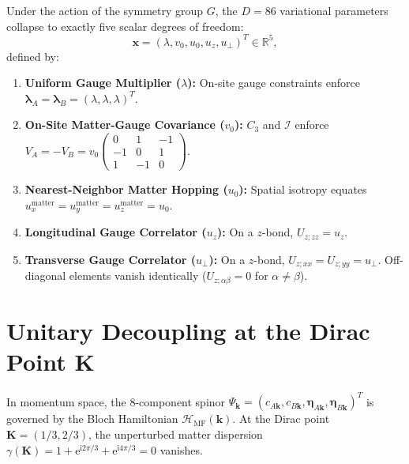 \begin{theorem}[Manifold Collapse to $D_{\mathrm{sym}} = 5$]
Under the action of the symmetry group $G$, the $D = 86$ variational parameters collapse to exactly five scalar degrees of freedom:
\begin{equation}
\label{eq:phase4_sym_vector}
\bm{x} = (\lambda, v_0, u_0, u_z, u_\perp)^T \in \mathbb{R}^5,
\end{equation}
defined by:
\begin{enumerate}
    \item \textbf{Uniform Gauge Multiplier ($\lambda$):} On-site gauge constraints enforce $\bm{\lambda}_A = \bm{\lambda}_B = (\lambda, \lambda, \lambda)^T$.
    \item \textbf{On-Site Matter-Gauge Covariance ($v_0$):} $C_3$ and $\mathcal{I}$ enforce $V_A = -V_B = v_0 \begin{pmatrix} 0 & 1 & -1 \\ -1 & 0 & 1 \\ 1 & -1 & 0 \end{pmatrix}$.
    \item \textbf{Nearest-Neighbor Matter Hopping ($u_0$):} Spatial isotropy equates $u_x^{\mathrm{matter}} = u_y^{\mathrm{matter}} = u_z^{\mathrm{matter}} = u_0$.
    \item \textbf{Longitudinal Gauge Correlator ($u_z$):} On a $z$-bond, $U_{z; zz} = u_z$.
    \item \textbf{Transverse Gauge Correlator ($u_\perp$):} On a $z$-bond, $U_{z; xx} = U_{z; yy} = u_\perp$. Off-diagonal elements vanish identically ($U_{z; \alpha\beta} = 0$ for $\alpha \neq \beta$).
\end{enumerate}
\end{theorem}

\section{Unitary Decoupling at the Dirac Point $\mathbf{K}$}
\label{sec:phase4_unitary_decoupling}

In momentum space, the 8-component spinor $\Psi_{\bm{k}} = (c_{A\bm{k}}, c_{B\bm{k}}, \bm{\eta}_{A\bm{k}}, \bm{\eta}_{B\bm{k}})^T$ is governed by the Bloch Hamiltonian $\mathcal{H}_{\mathrm{MF}}(\bm{k})$. At the Dirac point $\mathbf{K} = (1/3, 2/3)$, the unperturbed matter dispersion $\gamma(\mathbf{K}) = 1 + \mathrm{e}^{\mathrm{i} 2\pi/3} + \mathrm{e}^{\mathrm{i} 4\pi/3} = 0$ vanishes.

